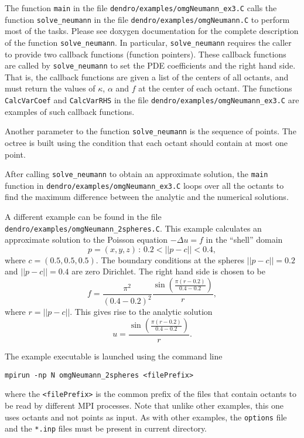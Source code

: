 \documentclass[12pt,reqno,a4paper]{report}
\numberwithin{equation}{section}
\begin{document}
The function \lstinline[basicstyle=\bfseries]!main! in the file \verb'dendro/examples/omgNeumann_ex3.C' calls the function \lstinline[basicstyle=\bfseries]!solve_neumann! in the file  \verb'dendro/examples/omgNeumann.C' to perform most of the tasks. Please see doxygen documentation for the complete description of the function \lstinline[basicstyle=\bfseries]!solve_neumann!. 
In particular, \lstinline[basicstyle=\bfseries]!solve_neumann! requires the caller to provide two callback functions (function pointers). These callback functions are called by \lstinline[basicstyle=\bfseries]'solve_neumann' to set the PDE coefficients and the right hand side. That is, the callback functions are given a list of the centers of all octants, and must return the values of $\kappa$, $\alpha$ and $f$ at the center of each octant. The functions \lstinline[basicstyle=\bfseries]'CalcVarCoef' and \lstinline[basicstyle=\bfseries]'CalcVarRHS' in the file \verb'dendro/examples/omgNeumann_ex3.C' are  examples of such callback functions.

Another parameter to the function \lstinline[basicstyle=\bfseries]'solve_neumann' is the sequence of points. The octree is built using the condition that each octant should contain at most one point.

After calling \lstinline[basicstyle=\bfseries]'solve_neumann' to obtain an approximate solution, the \lstinline[basicstyle=\bfseries]'main' function in \verb'dendro/examples/omgNeumann_ex3.C' loops over all the octants to find the maximum difference between the analytic and the numerical solutions.

A different example can be found in the file  \verb'dendro/examples/omgNeumann_2spheres.C'. This example calculates an approximate solution to the Poisson equation $-\Delta u = f$  in the ``shell'' domain 
\[
p=(x,y,z)\,:\, 0.2<||p-c||<0.4,
\]
where $c=(0.5,0.5,0.5)$. The boundary conditions at the spheres $||p-c||=0.2$ and $||p-c||=0.4$ are zero Dirichlet. The right hand side is chosen to be 
\[
f=\frac{\pi^2}{(0.4-0.2)^2}\frac{\sin(\frac{\pi(r-0.2)}{0.4-0.2})}{r}, 
\]
where $r=||p-c||$. This gives rise to the analytic solution 
\[
u=\frac{\sin(\frac{\pi(r-0.2)}{0.4-0.2})}{r}.
\]

The example executable is launched using the command line
\begin{verbatim}
mpirun -np N omgNeumann_2spheres <filePrefix>
\end{verbatim}
where the \verb|<filePrefix>| is the common prefix of the files that contain octants to be read by different 
MPI processes. Note that unlike other examples, this one uses octants and not points as input. As with other examples, the \verb'options' file and the \verb'*.inp' files must be present in current directory.
\end{document}
